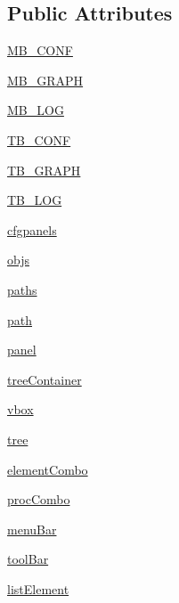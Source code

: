 \subsection*{Public Attributes}
\begin{DoxyCompactItemize}
\item 
\hyperlink{classAppFrame_1_1AppFrame_a4ff8d69e79895e94fe0c4457051e98e4}{MB\_\-CONF}
\item 
\hyperlink{classAppFrame_1_1AppFrame_a87cf4bd947402b005cdc8a8248bc7394}{MB\_\-GRAPH}
\item 
\hyperlink{classAppFrame_1_1AppFrame_aa4182d18214f9bcb8747b30d75566c4a}{MB\_\-LOG}
\item 
\hyperlink{classAppFrame_1_1AppFrame_a92adb26561ea695af9637bdd7cdcffda}{TB\_\-CONF}
\item 
\hyperlink{classAppFrame_1_1AppFrame_a054706bdc13f9c9e2b3a74c2cf659271}{TB\_\-GRAPH}
\item 
\hyperlink{classAppFrame_1_1AppFrame_aa6410672f90bddc15b60bddd6040c65b}{TB\_\-LOG}
\item 
\hyperlink{classAppFrame_1_1AppFrame_a0a19a7c7e9a6095cba6813e8d13e9bec}{cfgpanels}
\item 
\hyperlink{classAppFrame_1_1AppFrame_a7b899e2a2d3601a640bde2ba4a4c09b6}{objs}
\item 
\hyperlink{classAppFrame_1_1AppFrame_a9b64dca9c80270b7f0e36ee52d5f8c2d}{paths}
\item 
\hyperlink{classAppFrame_1_1AppFrame_aadc7ad0c96f9227da506b173bd7b2eee}{path}
\item 
\hyperlink{classAppFrame_1_1AppFrame_a814271a025b2beadb1187e3e9673b0fd}{panel}
\item 
\hyperlink{classAppFrame_1_1AppFrame_af5e0f9082a6580c786ad0a801dd31685}{treeContainer}
\item 
\hyperlink{classAppFrame_1_1AppFrame_ae267f6f9741bde298362f95ac19c97f2}{vbox}
\item 
\hyperlink{classAppFrame_1_1AppFrame_a1c088e6a3fc661ea80a336100160af9a}{tree}
\item 
\hyperlink{classAppFrame_1_1AppFrame_aac2972aa5a59df4897418cb34afc24bb}{elementCombo}
\item 
\hyperlink{classAppFrame_1_1AppFrame_afe103fbb66e1b2a6b7e9a64bd3154881}{procCombo}
\item 
\hyperlink{classAppFrame_1_1AppFrame_a9cbeda3bc1a78e934f1aebcd2c85e403}{menuBar}
\item 
\hyperlink{classAppFrame_1_1AppFrame_a2fd6329df31bbd37f1239f34a567d71a}{toolBar}
\item 
\hyperlink{classAppFrame_1_1AppFrame_ac23e75e7a9c9995eb55d7962342acd15}{listElement}
\end{DoxyCompactItemize}
